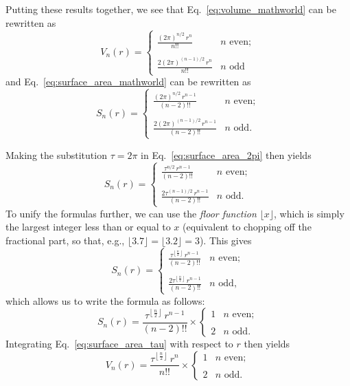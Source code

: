 Putting these results together, we see that Eq.~\eqref{eq:volume_mathworld} can be rewritten as
\begin{equation}
\label{eq:volume_2pi}
V_n(r) = \begin{cases}
 \displaystyle \frac{(2\pi)^{n/2}\,r^n}{n!!} & n \text{ even}; \\ \\
 \displaystyle \frac{2(2\pi)^{(n-1)/2}\,r^n}{n!!} & n \text{ odd}
 \end{cases}
\end{equation}
and Eq.~\eqref{eq:surface_area_mathworld} can be rewritten as
\begin{equation}
\label{eq:surface_area_2pi}
S_n(r) = \begin{cases}
\displaystyle \frac{(2\pi)^{n/2}\,r^{n-1}}{(n-2)!!} & n \text{ even}; \\ \\
\displaystyle \frac{2(2\pi)^{(n-1)/2}\,r^{n-1}}{(n-2)!!} & n \text{ odd}.
\end{cases}
\end{equation}

Making the substitution $\tau=2\pi$ in Eq.~\eqref{eq:surface_area_2pi} then yields
\[
S_n(r) = \begin{cases}
\displaystyle \frac{\tau^{n/2}\,r^{n-1}}{(n-2)!!} & n \text{ even}; \\ \\
\displaystyle \frac{2\tau^{(n-1)/2}\,r^{n-1}}{(n-2)!!} & n \text{ odd}.
\end{cases} \]
To unify the formulas further, we can use the \emph{floor function} $\lfloor x \rfloor$, which is simply the largest integer less than or equal to $x$ (equivalent to chopping off the fractional part, so that, e.g., $\lfloor 3.7 \rfloor = \lfloor 3.2 \rfloor = 3$). This gives
\[ S_n(r) = \begin{cases}
 \displaystyle \frac{\tau^{\left\lfloor \frac{n}{2} \right\rfloor}\,r^{n-1}}{(n-2)!!} & n \text{ even}; \\ \\
 \displaystyle \frac{2\tau^{\left\lfloor \frac{n}{2} \right\rfloor}\,r^{n-1}}{(n-2)!!} & n \text{ odd},
 \end{cases} \]
which allows us to write the formula as follows:
\begin{equation}
\label{eq:surface_area_tau}
S_n(r) = \frac{\tau^{\left\lfloor \frac{n}{2} \right\rfloor}\,r^{n-1}}{(n-2)!!}\times \begin{cases}
1 & n \text{ even}; \\ \\
2 & n \text{ odd}.
\end{cases}
\end{equation}
Integrating Eq.~\eqref{eq:surface_area_tau} with respect to $r$ then yields
\begin{equation}
\label{eq:volume_tau}
V_n(r) = \frac{\tau^{\left\lfloor \frac{n}{2} \right\rfloor}\,r^n}{n!!}\times \begin{cases}
1 & n \text{ even}; \\ \\
2 & n \text{ odd}.
\end{cases}
\end{equation}

